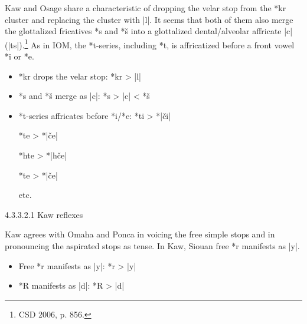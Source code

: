 \documentclass[output=paper]{LSP/langsci}
\begin{document}

Kaw and Osage share a characteristic of dropping the velar stop from the *kr cluster and replacing the cluster with |l|.  It seems that both of them also merge the glottalized fricatives *s\textsuperscript{} and *\v{s}\textsuperscript{} into a glottalized dental/alveolar affricate |c\textsuperscript{}| (|ts\textsuperscript{}|).\footnote{CSD 2006, p. 856.} As in IOM, the *t-series, including *t\textsuperscript{}, is affricatized before a front vowel *i or *e.  

\begin{itemize}
\item *kr drops the velar stop: \hspace{3em} *kr	>	|l|
\item *s\textsuperscript{} and *\v{s}\textsuperscript{} merge as |c\textsuperscript{}|: \hspace{3em} *s\textsuperscript{}	>	|c\textsuperscript{}|	<	*\v{s}\textsuperscript{}

\item *t-series affricates before *i/*e: \hspace{1em} *ti	>	*|\v{c}i|

\hspace{14em} *te	>	*|\v{c}e|

\hspace{14em} *hte	>	*|h\v{c}e|

\hspace{14em} *t\textsuperscript{}e	>	*|\v{c}\textsuperscript{}e|

\hspace{14em} etc.
\end{itemize}

4.3.3.2.1  Kaw reflexes
\vspace{1em}

Kaw agrees with Omaha and Ponca in voicing the free simple stops and in pronouncing the aspirated stops as tense.  In Kaw, Siouan free *r manifests as |y|.

\begin{itemize}
\item Free *r manifests as |y|: \hspace{1em} *r	>	|y|
\item *R manifests as |d|: \hspace{3em} *R	>	|d|
\end{itemize}
\end{document}
